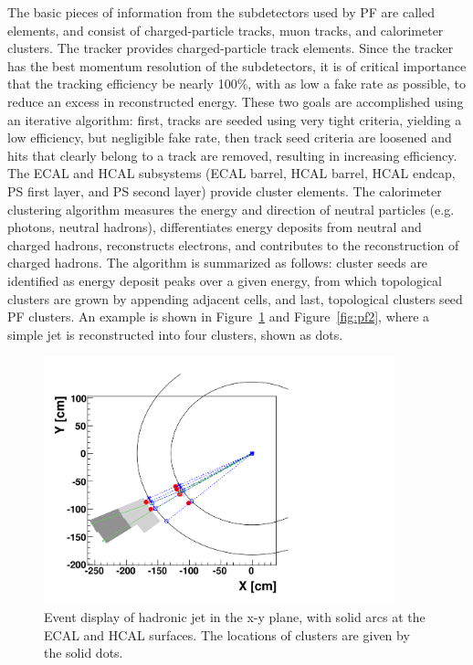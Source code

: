 \indent The basic pieces of information from the subdetectors used by PF are called elements, and consist of charged-particle tracks, muon tracks, and calorimeter clusters. The tracker provides charged-particle track elements. Since the tracker has the best momentum resolution of the subdetectors, it is of critical importance that the tracking efficiency be nearly 100\%, with as low a fake rate as possible, to reduce an excess in reconstructed energy. These two goals are accomplished using an iterative algorithm: first, tracks are seeded using very tight criteria, yielding a low efficiency, but negligible fake rate, then track seed criteria are loosened and hits that clearly belong to a track are removed, resulting in increasing efficiency. The ECAL and HCAL subsystems (ECAL barrel, HCAL barrel, HCAL endcap, PS first layer, and PS second layer) provide cluster elements. The calorimeter clustering algorithm measures the energy and direction of neutral particles (e.g. photons, neutral hadrons), differentiates energy deposits from neutral and charged hadrons, reconstructs electrons, and contributes to the reconstruction of charged hadrons. The algorithm is summarized as follows: cluster seeds are identified as energy deposit peaks over a given energy, from which topological clusters are grown by appending adjacent cells, and last, topological clusters seed PF clusters. An example is shown in Figure~\ref{fig:pf1} and Figure~\ref{fig:pf2}, where a simple jet is reconstructed into four clusters, shown as dots. 


\begin{figure}[tbh]
\centering
\includegraphics[width=4in]{figures/PFa.pdf}
\caption{Event display of hadronic jet in the x-y plane, with solid arcs at the ECAL and HCAL surfaces. The locations of clusters are given by the solid dots.}
\label{fig:pf1}
\end{figure}

